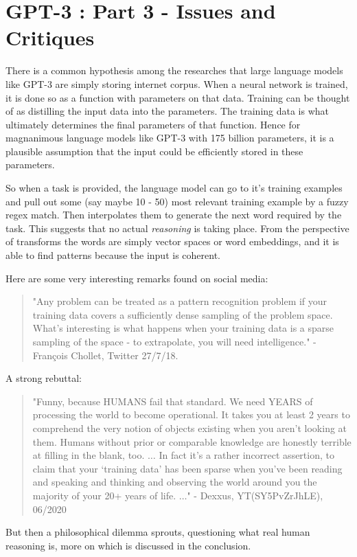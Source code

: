 \chapter*{GPT-3 : Part 3 - Issues and Critiques}
\label{chap:critiques}
\thispagestyle{fancy}

\hspace{0.5cm} There is a common hypothesis among the researches that large language models like GPT-3 are simply storing internet corpus. When a neural network is trained, it is done so as a function with parameters on that data. Training can be thought of as distilling the input data into the parameters. The training data is what ultimately determines the final parameters of that function. Hence for magnanimous language models like GPT-3 with 175 billion parameters, it is a plausible assumption that the input could be efficiently stored in these parameters.

So when a task is provided, the language model can go to it's training examples and pull out some (say maybe 10 - 50) most relevant training example by a fuzzy regex match. Then interpolates them to generate the next word required by the task. This suggests that no actual \emph{reasoning} is taking place. From the perspective of transforms the words are simply vector spaces or word embeddings, and it is able to find patterns because the input is coherent.

Here are some very interesting remarks found on social media:
\begin{quote}
    "Any problem can be treated as a pattern recognition problem if your training data covers a sufficiently dense sampling of the problem space. What's interesting is what happens when your training data is a sparse sampling of the space - to extrapolate, you will need intelligence." - François Chollet, Twitter 27/7/18.
\end{quote}

A strong rebuttal:

\begin{quote}
    "Funny, because HUMANS fail that standard. We need YEARS of processing the world to become operational. It takes you at least 2 years to comprehend the very notion of objects existing when you aren't looking at them. Humans without prior or comparable knowledge are honestly terrible at filling in the blank, too. $\hdots$ In fact it's a rather incorrect assertion, to claim that your `training data' has been sparse when you've been reading and speaking and thinking and observing the world around you the majority of your 20+ years of life. $\hdots$" -  Dexxus, YT(SY5PvZrJhLE), 06/2020
\end{quote}

But then a philosophical dilemma sprouts, questioning what real human reasoning is, more on which is discussed in the conclusion.
\vspace*{\fill}